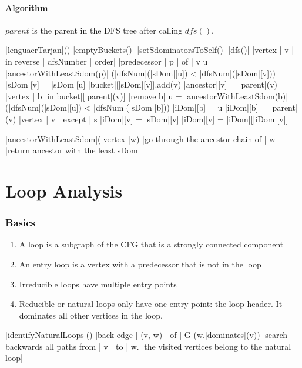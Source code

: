 \documentclass[a4paper,12pt, notitlepage]{article}
\newcommand{\negv}{\vspace{-0.7cm}}
\begin{document}
\paragraph*{Algorithm}
$parent$ is the parent in the DFS tree after calling $dfs()$.
\begin{program}
\PROC |lenguaerTarjan|() \BODY
    |emptyBuckets()|
    |setSdominatorsToSelf()|
    |dfs()|
    \FOREACH |vertex | v | in reverse | dfsNumber | order| \DO
        \FOREACH |predecessor | p | of | v \DO
            u = |ancestorWithLeastSdom(p)|
            \IF (|dfsNum|(|sDom|[u]) < |dfsNum|(|sDom|[v])) \AR*
                |sDom|[v] = |sDom|[u] 
            \FI
        \OD
        |bucket|[|sDom|[v]].add(v)
        |ancestor|[v] = |parent|(v) 
        \FOREACH |vertex | b| in bucket|[|parent|(v)] \DO
            |remove b|
            u = |ancestorWithLeastSdom(b)|
            \IF (|dfsNum|(|sDom|[u]) < |dfsNum|(|sDom|[b])) \AR*
                |iDom|[b] = u
            \ELSE
                |iDom|[b] = |parent|(v)
            \FI
        \OD
    \OD
    \FOREACH |vertex | v | except | s \DO
        \IF |iDom|[v] \not= |sDom|[v] \AR*
            |iDom|[v] = |iDom|[|iDom|[v]]
        \FI
    \OD
\end{program}
\negv
\begin{program}
\PROC |ancestorWithLeastSdom|(|vertex |w) \BODY
    |go through the ancestor chain of | w
    |return ancestor with the least sDom|
\end{program}

\section*{Loop Analysis}
\subsubsection*{Basics}
\begin{enumerate}
\item A loop is a subgraph of the CFG that is a strongly connected component
\item An entry loop is a vertex with a predecessor that is not in the loop
\item Irreducible loops have multiple entry points
\item Reducible or natural loops only have one entry point: the loop header. 
It dominates all other vertices in the loop.
\end{enumerate}
\negv
\begin{program}
\PROC |identifyNaturalLoops|() \BODY
    \FOREACH |back edge | (v, w) | of | G \DO
        \IF (w.|dominates|(v)) \AR*
            |search backwards all paths from | v | to | w.
            |the visited vertices belong to the natural loop|
        \FI
    \OD
\end{program}
\end{document}
